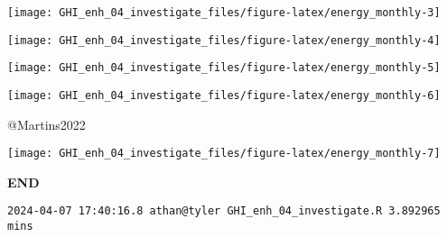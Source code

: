 \documentclass[
  10pt,
  a4paper,oneside]{article}
\begin{document}
\begin{center}\texttt{[image: GHI\_enh\_04\_investigate\_files/figure-latex/energy\_monthly-3]} \end{center}

\begin{center}\texttt{[image: GHI\_enh\_04\_investigate\_files/figure-latex/energy\_monthly-4]} \end{center}

\begin{center}\texttt{[image: GHI\_enh\_04\_investigate\_files/figure-latex/energy\_monthly-5]} \end{center}

\begin{center}\texttt{[image: GHI\_enh\_04\_investigate\_files/figure-latex/energy\_monthly-6]} \end{center}

@Martins2022

\begin{center}\texttt{[image: GHI\_enh\_04\_investigate\_files/figure-latex/energy\_monthly-7]} \end{center}

\textbf{END}

\begin{verbatim}
2024-04-07 17:40:16.8 athan@tyler GHI_enh_04_investigate.R 3.892965 mins
\end{verbatim}
\end{document}
